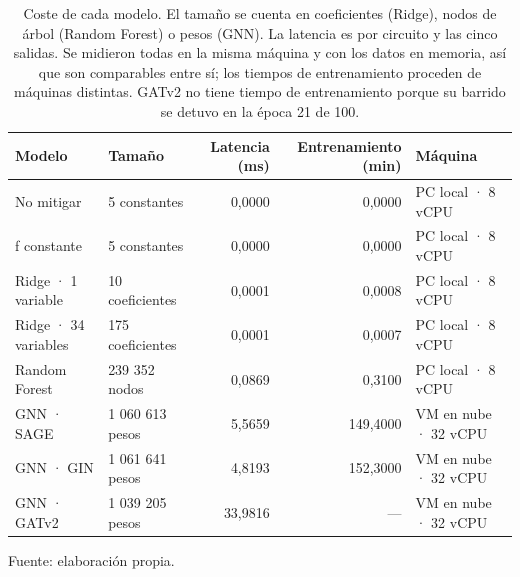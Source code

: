 \begin{table}[htbp]
    \centering
    {\footnotesize
    \begin{tabular}{@{}llrrl@{}}
        \toprule
        \textbf{Modelo} & \textbf{Tamaño} & \textbf{Latencia (ms)} & \textbf{Entrenamiento (min)} & \textbf{Máquina} \\
        \midrule
        No mitigar & 5 constantes & 0,0000 & 0,0000 & PC local · 8 vCPU \\
        f constante & 5 constantes & 0,0000 & 0,0000 & PC local · 8 vCPU \\
        Ridge · 1 variable & 10 coeficientes & 0,0001 & 0,0008 & PC local · 8 vCPU \\
        Ridge · 34 variables & 175 coeficientes & 0,0001 & 0,0007 & PC local · 8 vCPU \\
        Random Forest & 239 352 nodos & 0,0869 & 0,3100 & PC local · 8 vCPU \\
        GNN · SAGE & 1 060 613 pesos & 5,5659 & 149,4000 & VM en nube · 32 vCPU \\
        GNN · GIN & 1 061 641 pesos & 4,8193 & 152,3000 & VM en nube · 32 vCPU \\
        GNN · GATv2 & 1 039 205 pesos & 33,9816 & --- & VM en nube · 32 vCPU \\
        \bottomrule
    \end{tabular}}

    \caption{Coste de cada modelo. El tamaño se cuenta en coeficientes (Ridge), nodos de árbol (Random Forest) o pesos (GNN). La latencia es por circuito y las cinco salidas. Se midieron todas en la misma máquina y con los datos en memoria, así que son comparables entre sí; los tiempos de entrenamiento proceden de máquinas distintas. GATv2 no tiene tiempo de entrenamiento porque su barrido se detuvo en la época 21 de 100.}
    \label{tab:comparativa_coste}

    {\footnotesize Fuente: elaboración propia.}
\end{table}
